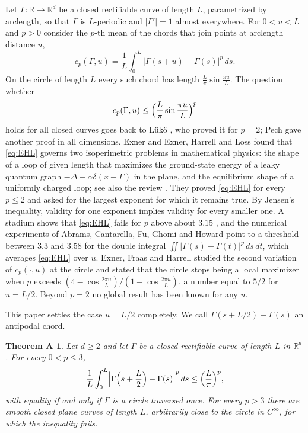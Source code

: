\documentclass[11pt]{amsart}
\newtheorem*{theoremA}{Theorem A}
\theoremstyle{definition}
\theoremstyle{remark}
\newcommand{\R}{\mathbb{R}}
\begin{document}
Let $\Gamma\colon\R\to\R^d$ be a closed rectifiable curve of length $L$, parametrized by arclength, so that $\Gamma$ is $L$-periodic and $|\Gamma'|=1$ almost everywhere. For $0<u<L$ and $p>0$ consider the $p$-th mean of the chords that join points at arclength distance $u$,
\[
c_p(\Gamma,u)=\frac1L\int_0^L|\Gamma(s+u)-\Gamma(s)|^p\,ds .
\]
On the circle of length $L$ every such chord has length $\frac L\pi\sin\frac{\pi u}L$. The question whether
\begin{equation}\label{eq:EHL}
c_p(\Gamma,u)\le\Bigl(\frac L\pi\sin\frac{\pi u}{L}\Bigr)^p
\end{equation}
holds for all closed curves goes back to Lük\H{o} \cite{Luk66}, who proved it for $p=2$; Pech \cite{Pec92} gave another proof in all dimensions. Exner \cite{Exn05} and Exner, Harrell and Loss \cite{EHL06,EHL06a} found that \eqref{eq:EHL} governs two isoperimetric problems in mathematical physics: the shape of a loop of given length that maximizes the ground-state energy of a leaky quantum graph $-\Delta-\alpha\delta(x-\Gamma)$ in the plane, and the equilibrium shape of a uniformly charged loop; see also the review \cite{Exn08}. They proved \eqref{eq:EHL} for every $p\le2$ and asked for the largest exponent for which it remains true. By Jensen's inequality, validity for one exponent implies validity for every smaller one. A stadium shows that \eqref{eq:EHL} fails for $p$ above about $3.15$ \cite{EHL06}, and the numerical experiments of Abrams, Cantarella, Fu, Ghomi and Howard \cite{ACFGH03} point to a threshold between $3.3$ and $3.58$ for the double integral $\iint|\Gamma(s)-\Gamma(t)|^p\,ds\,dt$, which averages \eqref{eq:EHL} over $u$. Exner, Fraas and Harrell \cite{EFH07} studied the second variation of $c_p(\cdot,u)$ at the circle and stated that the circle stops being a local maximizer when $p$ exceeds $(4-\cos\frac{2\pi u}L)/(1-\cos\frac{2\pi u}L)$, a number equal to $5/2$ for $u=L/2$. Beyond $p=2$ no global result has been known for any $u$.

This paper settles the case $u=L/2$ completely. We call $\Gamma(s+L/2)-\Gamma(s)$ an antipodal chord.

\begin{theoremA}
Let $d\ge2$ and let $\Gamma$ be a closed rectifiable curve of length $L$ in $\R^d$. For every $0<p\le3$,
\[
\frac1L\int_0^L\Bigl|\Gamma\Bigl(s+\frac L2\Bigr)-\Gamma(s)\Bigr|^p\,ds\le\Bigl(\frac L\pi\Bigr)^p ,
\]
with equality if and only if $\Gamma$ is a circle traversed once. For every $p>3$ there are smooth closed plane curves of length $L$, arbitrarily close to the circle in $C^\infty$, for which the inequality fails.
\end{theoremA}
\end{document}
